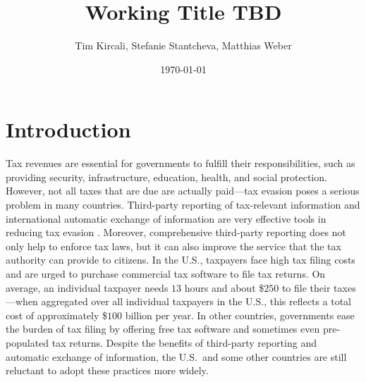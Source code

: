 \documentclass[12pt]{article}
\title{\textbf{\large{Working Title TBD}}}
\author{\normalsize{Tim Kircali, Stefanie Stantcheva, Matthias Weber}}
\date{\normalsize{\today}}
\begin{document}
\maketitle
{}


\section{Introduction}
Tax revenues are essential for governments to fulfill their responsibilities, such as providing security, infrastructure, education, health, and social protection. However, not all taxes that are due are actually paid---tax evasion poses a serious problem in many countries. Third-party reporting of tax-relevant information and international automatic exchange of information are very effective tools in reducing tax evasion \parencite{kleven2011unwilling, pomeranz2015no, slemrod2017does, boas2024taxing}. Moreover, comprehensive third-party reporting does not only help to enforce tax laws, but it can also improve the service that the tax authority can provide to citizens. In the U.S., taxpayers face high tax filing costs and are urged to purchase commercial tax software to file tax returns. On average, an individual taxpayer needs $13$ hours and about \$$250$ to file their taxes \parencite[][]{IRS2022}---when aggregated over all individual taxpayers in the U.S., this reflects a total cost of approximately \$$100$ billion per year. %
In other countries, governments ease the burden of tax filing by offering free tax software and sometimes even pre-populated tax returns. Despite the benefits of third-party reporting and automatic exchange of information, the U.S.\ and some other countries are still reluctant to adopt these practices more widely.
\end{document}
